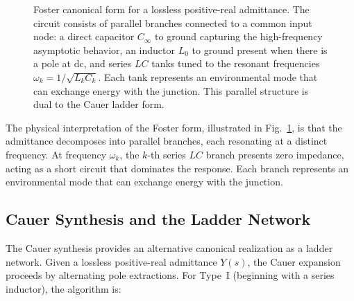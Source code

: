 \documentclass[reprint, floatfix, superscriptaddress, amsmath, amssymb, longbibliography]{revtex4-2}
\begin{document}
\begin{figure}[t]
\caption{Foster canonical form for a lossless positive-real admittance. The circuit consists of parallel branches connected to a common input node: a direct capacitor $C_\infty$ to ground capturing the high-frequency asymptotic behavior, an inductor $L_0$ to ground present when there is a pole at dc, and series $LC$ tanks tuned to the resonant frequencies $\omega_k = 1/\sqrt{L_k C_k}$. Each tank represents an environmental mode that can exchange energy with the junction. This parallel structure is dual to the Cauer ladder form.}
\label{fig:foster_synthesis}
\end{figure}

The physical interpretation of the Foster form, illustrated in Fig.~\ref{fig:foster_synthesis}, is that the admittance decomposes into parallel branches, each resonating at a distinct frequency. At frequency $\omega_k$, the $k$-th series $LC$ branch presents zero impedance, acting as a short circuit that dominates the response. Each branch represents an environmental mode that can exchange energy with the junction.

\subsection{Cauer Synthesis and the Ladder Network}
\label{sec:cauer_synthesis_detailed}

The Cauer synthesis provides an alternative canonical realization as a ladder network. Given a lossless positive-real admittance $Y(s)$, the Cauer expansion proceeds by alternating pole extractions. For Type~I (beginning with a series inductor), the algorithm is:
\end{document}
